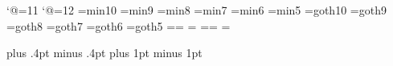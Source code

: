 
\catcode`@=11 %
\def\footnote#1{\let\@sf\empty %
  \ifhmode\edef\@sf{\spacefactor\the\spacefactor}\/\fi
  \nobreak#1\@sf\vfootnote{#1}}
\catcode`@=12 %
\font\tenmin=min10 %
\font\preloaded=min9
\font\preloaded=min8
\font\sevenmin=min7
\font\preloaded=min6
\font\fivemin=min5
\font\tengt=goth10 %
\font\preloaded=goth9
\font\preloaded=goth8
\font\sevengt=goth7
\font\preloaded=goth6
\font\fivegt=goth5
\newfam\minfam \def\mc{\fam\minfam\tenmin}%
\textfont\minfam=\tenmin\scriptfont\minfam=\sevenmin%
\scriptscriptfont\minfam=\fivemin
\newfam\gtfam \def\gt{\fam\gtfam\tengt}%
\textfont\gtfam=\tengt\scriptfont\gtfam=\sevengt%
\scriptscriptfont\gtfam=\fivegt

\mc		  %
\kanjiskip=0pt plus .4pt minus .4pt
\xkanjiskip=2.5pt plus 1pt minus 1pt
\autospacing\autoxspacing
{}
\def\fmtname{jplain}\def\fmtversion{2.3J} %
